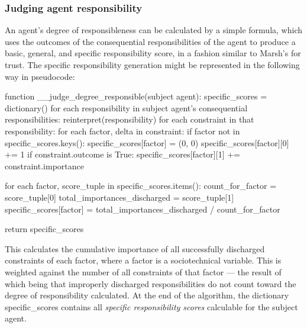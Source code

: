 \subsubsection{Judging agent responsibility}  %
An agent's degree of responsibleness can be calculated by a simple formula, which uses the outcomes of the consequential responsibilities of the agent to produce a basic, general, and specific responsibility score, in a fashion similar to Marsh's for trust\cite{Marsh1994FormalisingConcept}. The specific responsibility generation might be represented in the following way in pseudocode:

\begin{pseudocodelisting}
function __judge_degree_responsible(subject agent):
    specific_scores = dictionary()
    for each responsibility in subject agent's consequential responsibilities:
        reinterpret(responsibility)
        for each constraint in that responsibility:
            for each factor, delta in constraint:
                if factor not in specific_scores.keys():
                    specific_scores[factor] = (0, 0)
                specific_scores[factor][0] += 1
                if constraint.outcome is True:
                    specific_scores[factor][1] += constraint.importance
                    
    for each factor, score_tuple in specific_scores.items():
        count_for_factor = score_tuple[0]
        total_importances_discharged = score_tuple[1]
        specific_scores[factor] = total_importances_discharged / count_for_factor
        
    return specific_scores
\end{pseudocodelisting} 

This calculates the cumulative importance of all successfully discharged constraints of each factor, where a factor is a sociotechnical variable. This is weighted against the number of all constraints of that factor --- the result of which being that improperly discharged responsibilities do not count toward the degree of responsibility calculated. At the end of the algorithm, the dictionary specific\_scores contains all \emph{specific responsibility scores} calculable for the subject agent.\par

